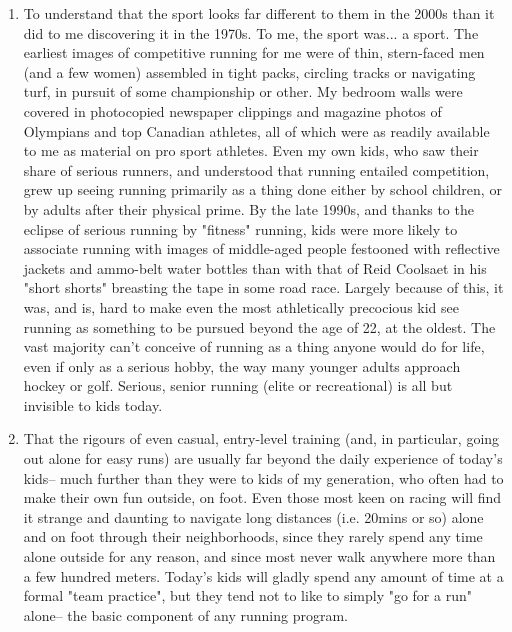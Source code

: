 \begin{enumerate}
    \item To understand that the sport looks far different to them in the 2000s than it did to me discovering it in the 1970s. To me, the sport was... a sport. The earliest images of competitive running for me were of thin, stern-faced men (and a few women) assembled in tight packs, circling tracks or navigating turf, in pursuit of some championship or other. My bedroom walls were covered in photocopied newspaper clippings and magazine photos of Olympians and top Canadian athletes, all of which were as readily available to me as material on pro sport athletes. Even my own kids, who saw their share of serious runners, and understood that running entailed competition, grew up seeing running primarily as a thing done either by school children, or by adults after their physical prime. By the late 1990s, and thanks to the eclipse of serious running by "fitness" running, kids were more likely to associate running with images of middle-aged people festooned with reflective jackets and ammo-belt water bottles than with that of Reid Coolsaet in his "short shorts" breasting the tape in some road race. Largely because of this, it was, and is, hard to make even the most athletically precocious kid see running as something to be pursued beyond the age of 22, at the oldest. The vast majority can't conceive of running as a thing anyone would do for life, even if only as a serious hobby, the way many younger adults approach hockey or golf. Serious, senior running (elite or recreational) is all but invisible to kids today.

    \item That the rigours of even casual, entry-level training (and, in particular, going out alone for easy runs) are usually far beyond the daily experience of today's kids-- much further than they were to kids of my generation, who often had to make their own fun outside, on foot. Even those most keen on racing will find it strange and daunting to navigate long distances (i.e. 20mins or so) alone and on foot through their neighborhoods, since they rarely spend any time alone outside for any reason, and since most never walk anywhere more than a few hundred meters. Today's kids will gladly spend any amount of time at a formal "team practice", but they tend not to like to simply "go for a run" alone-- the basic component of any running program.


\end{enumerate}
